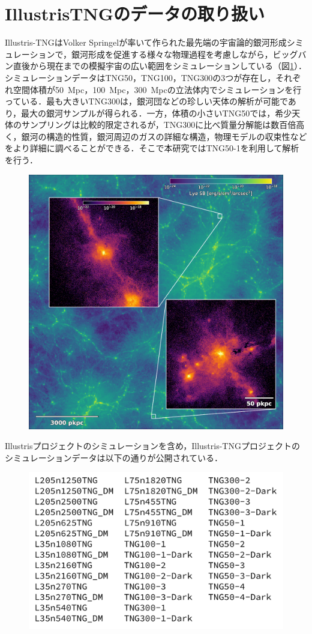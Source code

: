 \section{IllustrisTNGのデータの取り扱い}

Illustris-TNGはVolker Springelが率いて作られた最先端の宇宙論的銀河形成シミュレーションで，銀河形成を促進する様々な物理過程を考慮しながら，ビッグバン直後から現在までの模擬宇宙の広い範囲をシミュレーションしている（図\ref{fig:TNG50_z3_LymanAlpha_emission_2k}）．シミュレーションデータはTNG50，TNG100，TNG300の3つが存在し，それぞれ空間体積が\SI{50}{Mpc}，\SI{100}{Mpc}，\SI{300}{Mpc}の立法体内でシミュレーションを行っている．最も大きいTNG300は，銀河団などの珍しい天体の解析が可能であり，最大の銀河サンプルが得られる．一方，体積の小さいTNG50では，希少天体のサンプリングは比較的限定されるが，TNG300に比べ質量分解能は数百倍高く，銀河の構造的性質，銀河周辺のガスの詳細な構造，物理モデルの収束性などをより詳細に調べることができる．そこで本研究ではTNG50-1を利用して解析を行う．

\begin{figure}
	\centering
	\includegraphics[width=0.7\linewidth]{./pic/TNG50_z3_LymanAlpha_emission_2k.png}
	\caption{}
	\label{fig:TNG50_z3_LymanAlpha_emission_2k}
\end{figure}

Illustrisプロジェクトのシミュレーションを含め，Illustris-TNGプロジェクトのシミュレーションデータは以下の通りが公開されている．

\begin{figure}[H]
	\centering
	\includegraphics[width=0.5\linewidth]{./pic/ALLsimTNG.pdf}
\end{figure}

